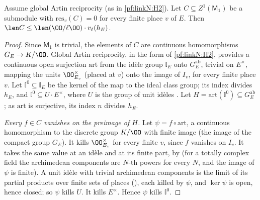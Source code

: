 \begin{lemma}\label{pf:linkN:unramhom}
Assume global Artin reciprocity (as in \cref{pf:linkN:H2}). Let $C\subseteq Z^1(\mathsf M_1)$ be a submodule with $\mathrm{res}_v(C)=0$ for every finite
place $v$ of $E$. Then $\len C\le\len(\OO/\ell\OO)\cdot v_\ell(h_E)$.
\end{lemma}

\begin{proof}
Since $\mathsf M_1$ is trivial, the elements of $C$ are continuous homomorphisms $G_E\to K/\OO$. Global Artin reciprocity, in the form of
\cref{pf:linkN:H2}, provides a continuous open surjection $\mathrm{art}$ from the id\`ele group $\mathbb I_E$ onto $G_E^{\mathrm{ab}}$, trivial on $E^\times$,
mapping the units $\OO_{E_v}^\times$ (placed at $v$) onto the image of $I_v$, for every finite place $v$. Let $\mathbb I^0\subseteq\mathbb I_E$ be the
kernel of the map to the ideal class group; its index divides $h_E$, and $\mathbb I^0\subseteq U\cdot E^\times$, where $U$ is the group of unit
id\`eles \cite[Ch.~VI, \S1]{Neukirch1999}. Let $H=\mathrm{art}(\mathbb I^0)\subseteq G_E^{\mathrm{ab}}$; as $\mathrm{art}$ is surjective, its index $n$
divides $h_E$.

\emph{Every $f\in C$ vanishes on the preimage of $H$.} Let $\psi=f\circ\mathrm{art}$, a continuous homomorphism to the discrete group $K/\OO$ with finite
image (the image of the compact group $G_E$). It kills $\OO_{E_v}^\times$ for every finite $v$, since $f$ vanishes on $I_v$. It takes the same
value at an id\`ele and at its finite part, by  (for a totally complex field the archimedean
components are $N$-th powers for every $N$, and the image of $\psi$ is finite). A unit id\`ele with trivial archimedean components is the limit
of its partial products over finite sets of places (), each killed by $\psi$, and $\ker\psi$ is
open, hence closed; so $\psi$ kills $U$. It kills $E^\times$. Hence $\psi$ kills $\mathbb I^0$.


\end{proof}
